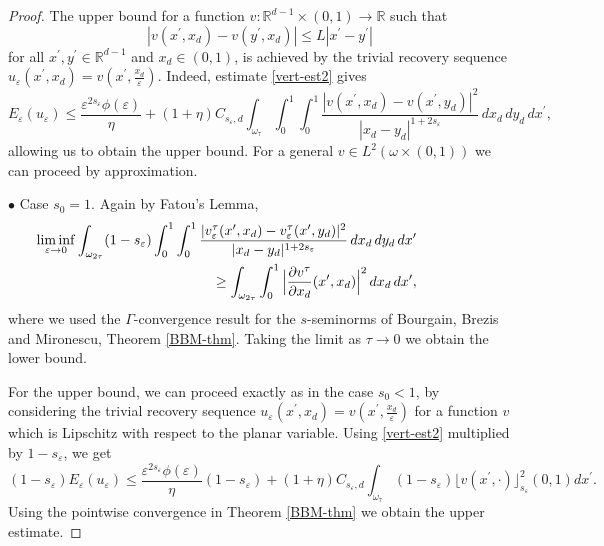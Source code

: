 \documentclass[11pt]{article}
\def\e{\varepsilon}
\begin{document}
\begin{proof}
The upper bound for a  function $v\colon\mathbb R^{d-1}\times(0,1)\to\mathbb R$ such that  
\begin{equation*}
|v(x^\prime, x_d)-v(y^\prime, x_d)|\leq L|x^\prime-y^\prime|
\end{equation*}
for all $x^\prime,y^\prime\in \mathbb R^{d-1}$ and $x_d\in (0,1)$, is achieved by the trivial recovery sequence $u_\e(x^\prime, x_d)=v(x^\prime, \frac{x_d}{\e})$. Indeed, estimate \eqref{vert-est2} gives 
$$E_\e(u_\e)\leq 
\frac{\e^{2s_\e}\phi(\e)}{\eta}+ (1+\eta)C_{s_\e,d}\int_{\omega_\tau}\int_0^1\int_0^1\frac{|v(x^\prime, x_d)-v(x^\prime, y_d)|^2}{|x_d-y_d|^{1+2s_\e}}\, dx_d\, dy_d\, dx^\prime,$$
allowing us to obtain the upper bound. 
For a general $v\in L^2(\omega\times (0,1))$ we can proceed by approximation. 


\smallskip  

$\bullet$ {Case $s_0=1$.} Again by Fatou's Lemma, 
\begin{eqnarray*}
&&\hspace{-2cm}\liminf_{\e\to 0}\int_{\omega_{2\tau}}(1-s_\e)\int_0^1\int_0^1\frac{|v^\tau_\e(x^\prime, x_d)-v^\tau_\e(x^\prime, y_d)|^2}{|x_d-y_d|^{1+2s_\e}}\, dx_d\, dy_d\, dx^\prime\\
&&\geq 
\int_{\omega_{2\tau}}\int_0^1 \Big|\frac{\partial v^\tau}{\partial x_d}(x^\prime,x_d)\Big|^2\, dx_d \, dx^\prime, 
\end{eqnarray*}
where we used the $\Gamma$-convergence result for the $s$-seminorms of Bourgain, Brezis and Mironescu, Theorem \ref{BBM-thm}. Taking the limit as $\tau\to 0$ we obtain the lower bound. 

\smallskip
For the upper bound, we can proceed exactly as in the case $s_0<1$, by considering the trivial recovery sequence $u_\e(x^\prime, x_d)=v(x^\prime, \frac{x_d}{\e})$ for a function $v$ which is Lipschitz with respect to the planar variable. Using \eqref{vert-est2} multiplied by $1-s_\e$, 
we get 
$$(1-s_\e)E_\e(u_\e)\leq 
\frac{\e^{2s_\e}\phi(\e)}{\eta}(1-s_\e)+ (1+\eta)C_{s_\e,d} \int_{\omega_\tau}(1-s_\e)
\lfloor v(x^\prime,\cdot) \rfloor^2_{s_\e}(0,1)dx^\prime.$$
Using the pointwise convergence in Theorem \ref{BBM-thm} we obtain the upper estimate. \end{proof}
\end{document}
